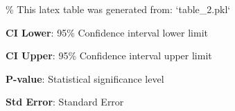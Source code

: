 \documentclass[11pt]{article}
\begin{document}
\begin{codeoutput}
\% This latex table was generated from: `table\_2.pkl`
\begin{table}[h]
\caption{Polynomial regression model with weight predicting OTTD.}
\label{table:poly\_regression\_model}
\begin{threeparttable}
\renewcommand{\TPTminimum}{\linewidth}
\begin{tablenotes}
\footnotesize
\item \textbf{CI Lower}: 95\% Confidence interval lower limit
\item \textbf{CI Upper}: 95\% Confidence interval upper limit
\item \textbf{P-value}: Statistical significance level
\item \textbf{Std Error}: Standard Error
\end{tablenotes}
\end{threeparttable}
\end{table}
\end{codeoutput}
\end{document}
